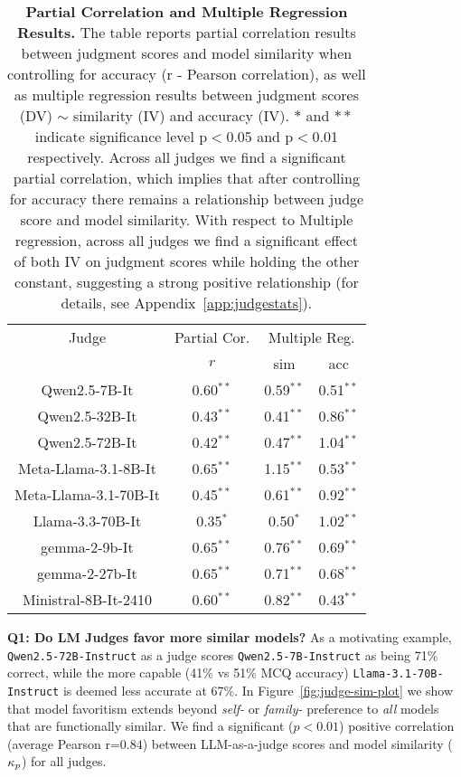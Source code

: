 \begin{table}[!h]
    \caption{\textbf{Partial Correlation and Multiple Regression Results.} The table reports partial correlation results between judgment scores and model similarity when controlling for accuracy (r - Pearson correlation), as well as multiple regression results between judgment scores (DV) $\sim$ similarity (IV) and accuracy (IV). $*$ and $**$ indicate significance level p$<$0.05 and p$<$0.01 respectively. Across all judges we find a significant partial correlation, which implies that after controlling for accuracy there remains a relationship between judge score and model similarity. With respect to Multiple regression, across all judges we find a significant effect of both IV on judgment scores while holding the other constant, suggesting a strong positive relationship (for details, see Appendix~\ref{app:judgestats}).}
  \begin{tabular}{cccc}
        \toprule
        Judge & {Partial Cor.} & \multicolumn{2}{c}{Multiple Reg.} \\ 
          & $r$ & sim & acc\\
        \hline 
        Qwen2.5-7B-It & 0.60$^{**}$ & 0.59$^{**}$ & 0.51$^{**}$ \\ 
        Qwen2.5-32B-It & 0.43$^{**}$ & 0.41$^{**}$ & 0.86$^{**}$ \\ 
        Qwen2.5-72B-It & 0.42$^{**}$ & 0.47$^{**}$ & 1.04$^{**}$ \\ 
        Meta-Llama-3.1-8B-It & 0.65$^{**}$ & 1.15$^{**}$ & 0.53$^{**}$ \\ 
        Meta-Llama-3.1-70B-It & 0.45$^{**}$ & 0.61$^{**}$ & 0.92$^{**}$ \\ 
        Llama-3.3-70B-It & 0.35$^{*}$ & 0.50$^{*}$ & 1.02$^{**}$ \\ 
        gemma-2-9b-It & 0.65$^{**}$ & 0.76$^{**}$ & 0.69$^{**}$ \\ 
        gemma-2-27b-It & 0.65$^{**}$ & 0.71$^{**}$ & 0.68$^{**}$ \\ 
        Ministral-8B-It-2410 & 0.60$^{**}$ & 0.82$^{**}$ & 0.43$^{**}$ \\ 
        \bottomrule
    \end{tabular}
    
    \label{tab:pc_mr}
\end{table}

\textbf{Q1: Do LM Judges favor more similar models?}
As a motivating example, \texttt{Qwen2.5-72B-Instruct} as a judge scores \texttt{Qwen2.5-7B-Instruct} as being 71\% correct, while the more capable (41\% vs 51\% MCQ accuracy) \texttt{Llama-3.1-70B-Instruct} is deemed less accurate at 67\%. In Figure~\ref{fig:judge-sim-plot} we show that model favoritism extends beyond \textit{self-} or \textit{family-} preference to \textit{all} models that are functionally similar. We find a significant ($p<0.01$) positive correlation (average Pearson r=$0.84$) between LLM-as-a-judge scores and model similarity ($\kappa_{p}$) for all judges.

